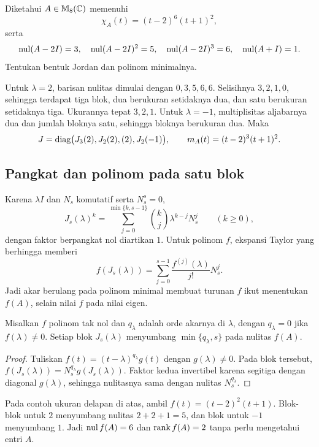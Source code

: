 \begin{exam}
    Diketahui $A\in\mathbb{M}_8(\mathbb{C})$ memenuhi
    \[
        \chi_A(t)=(t-2)^6(t+1)^2,
    \]
    serta
    \[
        \operatorname{nul}(A-2I)=3,\quad\operatorname{nul}(A-2I)^2=5,\quad
        \operatorname{nul}(A-2I)^3=6,\quad\operatorname{nul}(A+I)=1.
    \]
    Tentukan bentuk Jordan dan polinom minimalnya.
\end{exam}
\begin{solution}
    Untuk $\lambda=2$, barisan nulitas dimulai dengan $0,3,5,6,6$.
    Selisihnya $3,2,1,0$, sehingga terdapat tiga blok, dua berukuran
    setidaknya dua, dan satu berukuran setidaknya tiga.
    Ukurannya tepat $3,2,1$.
    Untuk $\lambda=-1$, multiplisitas aljabarnya dua dan jumlah bloknya
    satu, sehingga bloknya berukuran dua. Maka
    \[
        J=\operatorname{diag}\bigl(J_3(2),J_2(2),(2),J_2(-1)\bigr),\qquad
        m_A(t)=(t-2)^3(t+1)^2.
    \]
\end{solution}

\subsection{Pangkat dan polinom pada satu blok}

Karena $\lambda I$ dan $N_s$ komutatif serta $N_s^s=0$,
\[
    J_s(\lambda)^k
    =\sum_{j=0}^{\min\{k,s-1\}}\binom{k}{j}\lambda^{k-j}N_s^j
    \qquad(k\ge0),
\]
dengan faktor berpangkat nol diartikan $1$.
Untuk polinom $f$, ekspansi Taylor yang berhingga memberi
\[
    f(J_s(\lambda))
    =\sum_{j=0}^{s-1}\frac{f^{(j)}(\lambda)}{j!}N_s^j.
\]
Jadi akar berulang pada polinom minimal membuat turunan $f$ ikut
menentukan $f(A)$, selain nilai $f$ pada nilai eigen.

\begin{prop}
    \label{eigen:nulitas-polinom}
    Misalkan $f$ polinom tak nol dan $q_\lambda$ adalah orde akarnya
    di $\lambda$, dengan $q_\lambda=0$ jika $f(\lambda)\ne0$.
    Setiap blok $J_s(\lambda)$ menyumbang
    $\min\{q_\lambda,s\}$ pada nulitas $f(A)$.
\end{prop}
\begin{proof}
    Tuliskan $f(t)=(t-\lambda)^{q_\lambda}g(t)$ dengan
    $g(\lambda)\ne0$. Pada blok tersebut,
    $f(J_s(\lambda))=N_s^{q_\lambda}g(J_s(\lambda))$.
    Faktor kedua invertibel karena segitiga dengan diagonal
    $g(\lambda)$, sehingga nulitasnya sama dengan nulitas
    $N_s^{q_\lambda}$.
\end{proof}

Pada contoh ukuran delapan di atas, ambil
$f(t)=(t-2)^2(t+1)$. Blok-blok untuk $2$ menyumbang nulitas
$2+2+1=5$, dan blok untuk $-1$ menyumbang $1$.
Jadi $\operatorname{nul} f(A)=6$ dan $\operatorname{rank} f(A)=2$ tanpa perlu mengetahui entri $A$.

